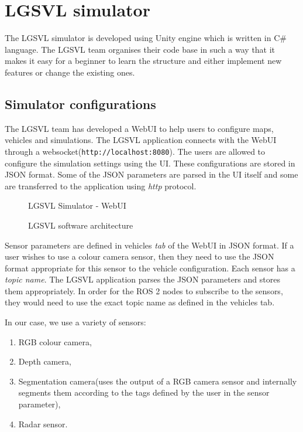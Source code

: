 \section{LGSVL simulator}
The LGSVL simulator is developed using Unity engine which is written in C\# language.
The LGSVL team organises their code base\cite{lgsvlgithub} in such a way that it makes it
easy for a beginner to learn the structure and either implement new features or change the
existing ones.

\subsection{Simulator configurations}
The LGSVL team has developed a WebUI to help users to configure maps, vehicles and
simulations. The LGSVL application connects with the WebUI through a
websocket(\texttt{http://localhost:8080}). The users are allowed to configure the
simulation settings using the UI. These configurations are stored in JSON format. Some of the JSON parameters
are parsed in the UI itself and some are transferred to the application using
\textit{http} protocol.

\begin{wrapfigure}{l}{0.4\textwidth}
	\centering
    \def\svgwidth{0.4\textwidth}
    \caption{LGSVL Simulator - WebUI}
    \label{fig:lgsvlwebui}
    \vspace{-15pt}
\end{wrapfigure}

\begin{figure}
	\centering
    \def\svgwidth{0.6\textwidth}
    \caption{LGSVL software architecture}
    \label{fig:lgsvlswarchitecture}
\end{figure}
Sensor parameters are defined in vehicles \textit{tab} of the WebUI in JSON format. If a user wishes to use a colour camera
sensor, then they need to use the JSON format appropriate for this sensor to the vehicle
configuration. Each sensor has a \textit{topic name}. The LGSVL application parses the JSON
parameters and stores them appropriately. In order for the ROS 2 nodes to subscribe to the
sensors, they would need to use the exact topic name as defined in the vehicles tab.

In our case, we use a variety of sensors:
\begin{enumerate}
    \item RGB colour camera,
    \item Depth camera,
    \item Segmentation camera(uses the output of a RGB camera sensor and internally segments them
according to the tags defined by the user in the sensor parameter),
    \item Radar sensor.
\end{enumerate}


